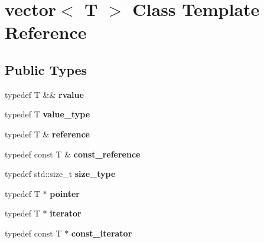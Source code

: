 \hypertarget{classvector}{}\section{vector$<$ T $>$ Class Template Reference}
\label{classvector}
\subsection*{Public Types}
\begin{DoxyCompactItemize}
\item 
\mbox{\label{classvector_a77584ab6314b763dc0b7d02dea1fc8f6}} 
typedef T \&\& {\bfseries rvalue}
\item 
\mbox{\label{classvector_a4bd5e2af88d5b9eea4fc9c15908dce4e}} 
typedef T {\bfseries value\+\_\+type}
\item 
\mbox{\label{classvector_a5611f6d1d902a469cc48de23bd359987}} 
typedef T \& {\bfseries reference}
\item 
\mbox{\label{classvector_a0aecfe435679f870fabbdfb93ebc58ba}} 
typedef const T \& {\bfseries const\+\_\+reference}
\item 
\mbox{\label{classvector_a3dc852307915f0b623f4b182f1eb9e74}} 
typedef std\+::size\+\_\+t {\bfseries size\+\_\+type}
\item 
\mbox{\label{classvector_a124266a4848316513af3decdac720054}} 
typedef T $\ast$ {\bfseries pointer}
\item 
\mbox{\label{classvector_acca0fb7cb134e254d33a83c4469faf62}} 
typedef T $\ast$ {\bfseries iterator}
\item 
\mbox{\label{classvector_a59ea8b81dadaa7ee32f91d51435f67c0}} 
typedef const T $\ast$ {\bfseries const\+\_\+iterator}
\end{DoxyCompactItemize}
